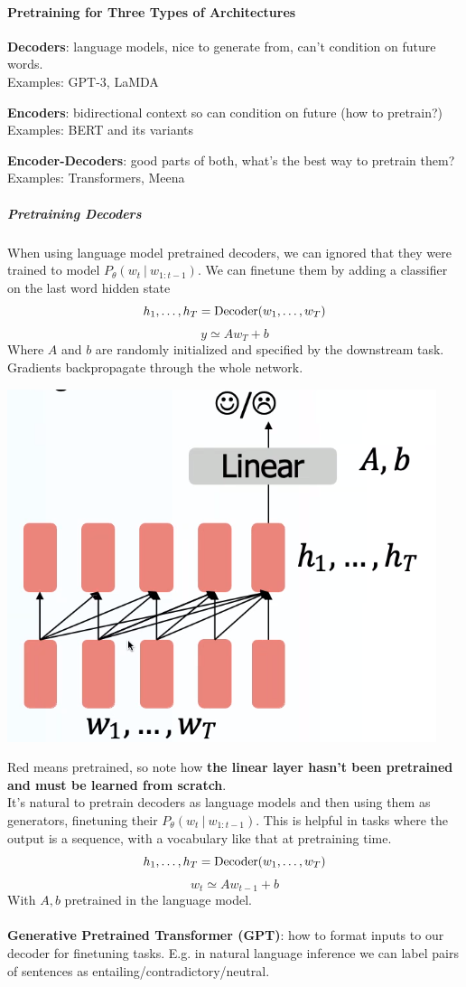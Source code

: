 \documentclass[10pt]{report}
\begin{document}
\paragraph{Pretraining for Three Types of Architectures}
\begin{list}{}{}
	\item \textbf{Decoders}: language models, nice to generate from, can't condition on future words.\\
	Examples: GPT-3, LaMDA
	\item \textbf{Encoders}: bidirectional context so can condition on future (how to pretrain?)\\
	Examples: BERT and its variants
	\item \textbf{Encoder-Decoders}: good parts of both, what's the best way to pretrain them?\\
	Examples: Transformers, Meena
\end{list}
\subparagraph{Pretraining Decoders} When using language model pretrained decoders, we can ignored that they were trained to model $P_\theta(w_t\:|\:w_{1:t-1})$. We can finetune them by adding a classifier on the last word hidden state
$$h_1,\ldots,h_T = \hbox{Decoder}(w_1,\ldots,w_T)$$
$$y\simeq Aw_T + b$$
Where $A$ and $b$ are randomly initialized and specified by the downstream task. Gradients backpropagate through the whole network.\begin{center}
	\includegraphics[scale=0.5]{75.png}
\end{center}
Red means pretrained, so note how \textbf{the linear layer hasn't been pretrained and must be learned from scratch}.\\
It's natural to pretrain decoders as language models and then using them as generators, finetuning their $P_\theta(w_t\:|\:w_{1:t-1})$. This is helpful in tasks where the output is a sequence, with a vocabulary like that at pretraining time.
$$h_1,\ldots,h_T = \hbox{Decoder}(w_1,\ldots,w_T)$$
$$w_t\simeq Aw_{t-1} + b$$
With $A,b$ pretrained in the language model.\\\\
\textbf{Generative Pretrained Transformer (GPT)}: how to format inputs to our decoder for finetuning tasks. E.g. in natural language inference we can label pairs of sentences as entailing/contradictory/neutral.
\end{document}
